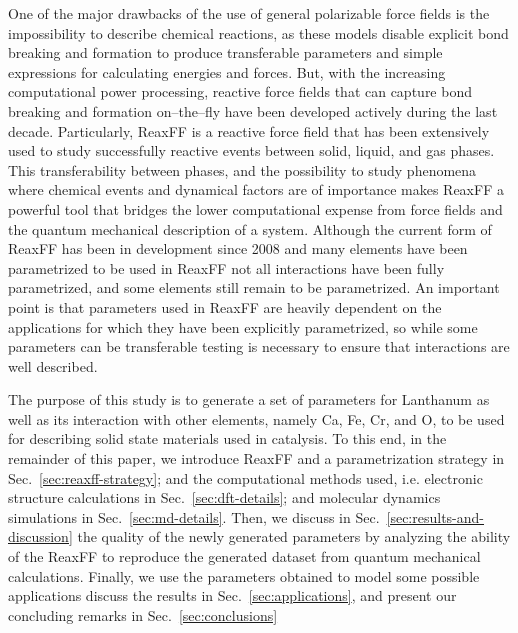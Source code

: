 \documentclass[journal=jpcafh,manuscript=article]{achemso}
\begin{document}
One of the major drawbacks of the use of general polarizable force fields is the impossibility to describe chemical reactions, as these models disable explicit bond breaking and formation to produce transferable parameters and simple expressions for calculating energies and forces.
But, with the increasing computational power processing, reactive force fields that can capture bond breaking and formation on--the--fly have been developed actively during the last decade.
Particularly, ReaxFF is a reactive force field that has been extensively used to study successfully reactive events between solid, liquid, and gas phases.
This transferability between phases, and the possibility to study phenomena where chemical events and dynamical factors are of importance makes ReaxFF a powerful tool that bridges the lower computational expense from force fields and the quantum mechanical description of a system.
Although the current form of ReaxFF has been in development since 2008 \cite{chenoweth_reaxff_2008} and many elements have been parametrized to be used in ReaxFF not all interactions have been fully parametrized, and some elements still remain to be parametrized.
An important point is that parameters used in ReaxFF are heavily dependent on the applications for which they have been explicitly parametrized, so while some parameters can be transferable testing is necessary to ensure that interactions are well described.

The purpose of this study is to generate a set of parameters for Lanthanum as well as its interaction with other elements, namely Ca, Fe, Cr, and O, to be used for describing solid state materials used in catalysis.
To this end, in the remainder of this paper, we introduce ReaxFF and a parametrization strategy in Sec.~\ref{sec:reaxff-strategy}; and the computational methods used, i.e. electronic structure calculations in Sec.~\ref{sec:dft-details}; and molecular dynamics simulations in Sec.~\ref{sec:md-details}.
Then, we discuss in Sec.~\ref{sec:results-and-discussion} the quality of the newly generated parameters by analyzing the ability of the ReaxFF to reproduce the generated dataset from quantum mechanical calculations.
Finally, we use the parameters obtained to model some possible applications discuss the results in Sec.~\ref{sec:applications}, and present our concluding remarks in Sec.~\ref{sec:conclusions}

%
%
\end{document}
